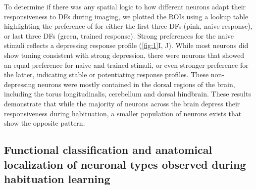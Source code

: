 \documentclass[9pt,lineno]{RandlettLab_elife}
\begin{document}
To determine if there was any spatial logic to how different neurons adapt their responsiveness to DFs during imaging, we plotted the ROIs using a lookup table highlighting the preference of for either the first three DFs (pink, naive response), or last three DFs (green, trained response). Strong preferences for the naive stimuli reflects a depressing response profile (\autoref{fig:1}I, J). While most neurons did show tuning consistent with strong depression, there were neurons that showed an equal preference for naive and trained stimuli, or even stronger preference for the latter, indicating stable or potentiating response profiles. These non-depressing neurons were mostly contained in the dorsal regions of the brain, including the torus longitudinalis, cerebellum and dorsal hindbrain. These results demonstrate that while the majority of neurons across the brain depress their responsiveness during habituation, a smaller population of neurons exists that show the opposite pattern. 

\subsection{Functional classification and anatomical localization of neuronal types observed during habituation learning}
\vspace{3mm}
\end{document}
